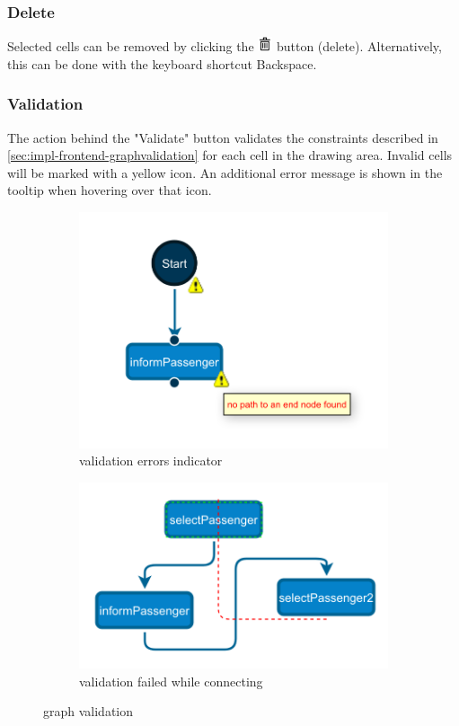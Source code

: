 \documentclass[a4paper,top=25mm,bottom=25mm,12pt,pdftex,halfparskip,twoside,bibtotoc,numbers=noenddot]{scrbook}
\begin{document}
\subsubsection{Delete}

Selected cells can be removed by clicking the \includegraphics[height=12pt]{editor-toolbar-trash} button (delete). Alternatively, this can be done with the keyboard shortcut \textsf{Backspace}.

\subsubsection{Validation}

The action behind the "Validate" button validates the constraints described in \ref{sec:impl-frontend-graphvalidation} for each cell in the drawing area. Invalid cells will be marked with a yellow icon. An additional error message is shown in the tooltip when hovering over that icon.

\begin{figure}
\centering
\begin{subfigure}{.4\textwidth}
  \centering
  \includegraphics[width=.8\linewidth]{validate1}
  \caption{validation errors indicator}
\end{subfigure}
\begin{subfigure}{.4\textwidth}
  \centering
  \includegraphics[width=.8\linewidth]{validate2}
  \caption{validation failed while connecting}
\end{subfigure}
\caption{graph validation}
\label{fig:cell-validation}
\end{figure}
\end{document}

